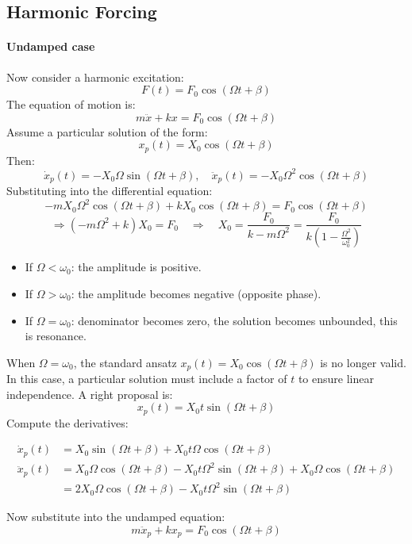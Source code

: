 \subsection{Harmonic Forcing}

\paragraph{Undamped case} Now consider a harmonic excitation:
\[
F(t) = F_0 \cos(\Omega t + \beta)
\]
The equation of motion is:
\[
m \ddot{x} + k x = F_0 \cos(\Omega t + \beta)
\]
Assume a particular solution of the form:
\[
x_p(t) = X_0 \cos(\Omega t + \beta)
\]
Then:
\[
\dot{x}_p(t) = -X_0 \Omega \sin(\Omega t + \beta), \quad
\ddot{x}_p(t) = -X_0 \Omega^2 \cos(\Omega t + \beta)
\]
Substituting into the differential equation:
\[
- m X_0 \Omega^2 \cos(\Omega t + \beta) + k X_0 \cos(\Omega t + \beta) = F_0 \cos(\Omega t + \beta)
\]
\[
\Rightarrow \left( -m \Omega^2 + k \right) X_0 = F_0
\quad \Rightarrow \quad
X_0 = \frac{F_0}{k - m \Omega^2} = \frac{F_0}{k \left( 1 - \frac{\Omega^2}{\omega_0^2} \right)}
\]

\begin{itemize}
  \item If \( \Omega < \omega_0 \): the amplitude is positive.
  \item If \( \Omega > \omega_0 \): the amplitude becomes negative (opposite phase).
  \item If \( \Omega = \omega_0 \): denominator becomes zero, the solution becomes unbounded, this is resonance.
\end{itemize}
When \( \Omega = \omega_0 \), the standard ansatz \( x_p(t) = X_0 \cos(\Omega t + \beta) \) is no longer valid. In this case, a particular solution must include a factor of \( t \) to ensure linear independence. A right proposal is:
\[
x_p(t) = X_0 t \sin(\Omega t + \beta)
\]
Compute the derivatives:

\begin{align*}
\dot{x}_p(t) &= X_0 \sin(\Omega t + \beta) + X_0 t \Omega \cos(\Omega t + \beta) \\
\ddot{x}_p(t) &= X_0 \Omega \cos(\Omega t + \beta) 
- X_0 t \Omega^2 \sin(\Omega t + \beta)
+ X_0 \Omega \cos(\Omega t + \beta) \\
&= 2 X_0 \Omega \cos(\Omega t + \beta) 
- X_0 t \Omega^2 \sin(\Omega t + \beta)
\end{align*}

Now substitute into the undamped equation:
\[
m \ddot{x}_p + k x_p = F_0 \cos(\Omega t + \beta)
\]

